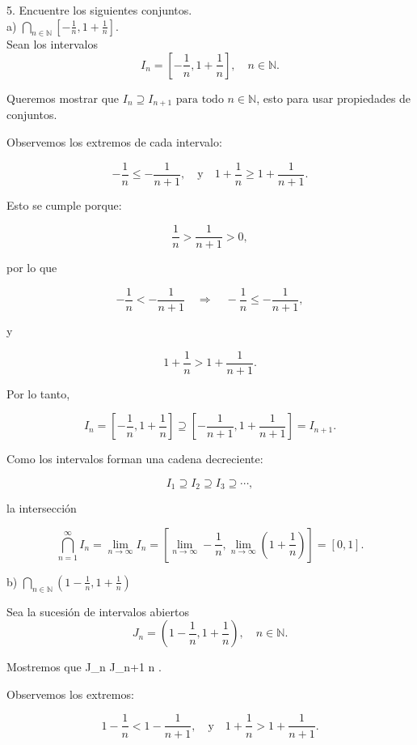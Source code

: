 5. Encuentre los siguientes conjuntos. \\
a) \( \bigcap_{n \in \mathbb{N}}\left[-\frac{1}{n}, 1+\frac{1}{n}\right] \). \\
Sean los intervalos
\[
I_n = \left[-\frac{1}{n}, 1 + \frac{1}{n}\right], \quad n \in \mathbb{N}.
\]

Queremos mostrar que $I_n \supseteq I_{n+1} \text{ para todo } n \in \mathbb{N}$, esto para usar propiedades de conjuntos.

\medskip

Observemos los extremos de cada intervalo:

\[
-\frac{1}{n} \leq -\frac{1}{n+1}, \quad \text{y} \quad 1 + \frac{1}{n} \geq 1 + \frac{1}{n+1}.
\]

Esto se cumple porque:

\[
\frac{1}{n} > \frac{1}{n+1} > 0,
\]

por lo que

\[
-\frac{1}{n} < -\frac{1}{n+1} \quad \Rightarrow \quad -\frac{1}{n} \leq -\frac{1}{n+1},
\]

y

\[
1 + \frac{1}{n} > 1 + \frac{1}{n+1}.
\]

Por lo tanto,

\[
I_n = \left[-\frac{1}{n}, 1 + \frac{1}{n}\right] \supseteq \left[-\frac{1}{n+1}, 1 + \frac{1}{n+1}\right] = I_{n+1}.
\]

\medskip

Como los intervalos forman una cadena decreciente:

\[
I_1 \supseteq I_2 \supseteq I_3 \supseteq \cdots,
\]

la intersección

\[
\bigcap_{n=1}^\infty I_n = \lim_{n \to \infty} I_n = \left[\lim_{n \to \infty} -\frac{1}{n}, \lim_{n \to \infty} \left(1 + \frac{1}{n}\right)\right] = [0,1].
\]


b) $\bigcap_{n \in \mathbb{N}} \left(1 - \frac{1}{n}, 1 + \frac{1}{n}\right)$

\medskip

Sea la sucesión de intervalos abiertos
\[
J_n = \left(1 - \frac{1}{n}, 1 + \frac{1}{n}\right), \quad n \in \mathbb{N}.
\]

Mostremos que J_n \supseteq J_{n+1}  n \in {}.

\medskip

Observemos los extremos:

\[
1 - \frac{1}{n} < 1 - \frac{1}{n+1}, \quad \text{y} \quad 1 + \frac{1}{n} > 1 + \frac{1}{n+1}.
\]

